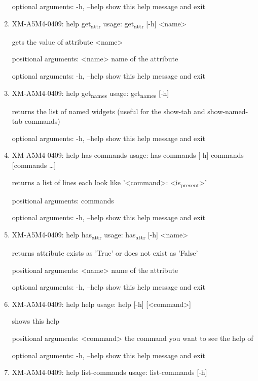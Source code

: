 \documentclass[11pt]{article}
\begin{document}
\begin{enumerate}
optional arguments:
  -h, --help  show this help message and exit

\item XM-A5M4-0409: help get\textsubscript{attr}
\label{sec:org2d61ad2}
usage: get\textsubscript{attr} [-h] <name>

gets the value of attribute <name>

positional arguments:
  <name>      name of the attribute

optional arguments:
  -h, --help  show this help message and exit

\item XM-A5M4-0409: help get\textsubscript{names}
\label{sec:org403f233}
usage: get\textsubscript{names} [-h]

returns the list of named widgets (useful for the show-tab and show-named-tab
commands)

optional arguments:
  -h, --help  show this help message and exit

\item XM-A5M4-0409: help has-commands
\label{sec:org9839f00}
usage: has-commands [-h] commands [commands \ldots{}]

returns a list of lines each look like '<command>: <is\textsubscript{present}>'

positional arguments:
  commands

optional arguments:
  -h, --help  show this help message and exit

\item XM-A5M4-0409: help has\textsubscript{attr}
\label{sec:org8cf66d7}
usage: has\textsubscript{attr} [-h] <name>

returns attribute exists as 'True' or does not exist as 'False'

positional arguments:
  <name>      name of the attribute

optional arguments:
  -h, --help  show this help message and exit

\item XM-A5M4-0409: help help
\label{sec:orge06cf00}
usage: help [-h] [<command>]

shows this help

positional arguments:
  <command>   the command you want to see the help of

optional arguments:
  -h, --help  show this help message and exit

\item XM-A5M4-0409: help list-commands
\label{sec:org99e19fd}
usage: list-commands [-h]


\end{enumerate}
\end{document}
